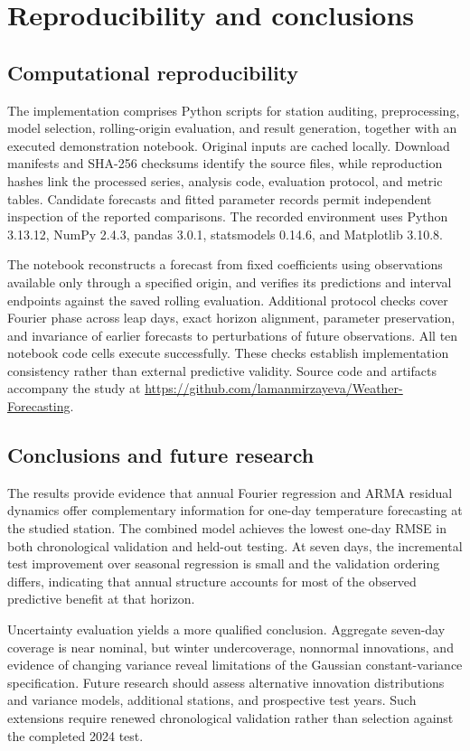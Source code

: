 \documentclass{article}
\begin{document}
\newpage
\section{Reproducibility and conclusions}
\subsection{Computational reproducibility}
The implementation comprises Python scripts for station auditing,
preprocessing, model selection, rolling-origin evaluation, and result
generation, together with an executed demonstration notebook. Original inputs
are cached locally. Download manifests and SHA-256 checksums identify the
source files, while reproduction hashes link the processed series, analysis
code, evaluation protocol, and metric tables. Candidate forecasts and fitted
parameter records permit independent inspection of the reported comparisons.
The recorded environment uses Python 3.13.12, NumPy 2.4.3, pandas 3.0.1,
statsmodels 0.14.6, and Matplotlib 3.10.8.

The notebook reconstructs a forecast from fixed coefficients using observations
available only through a specified origin, and verifies its predictions and
interval endpoints against the saved rolling evaluation. Additional protocol
checks cover Fourier phase across leap days, exact horizon alignment,
parameter preservation, and invariance of earlier forecasts to perturbations
of future observations. All ten notebook code cells execute successfully.
These checks establish implementation consistency rather than external
predictive validity. Source code and artifacts accompany the study at
\url{https://github.com/lamanmirzayeva/Weather-Forecasting}.

\subsection{Conclusions and future research}
The results provide evidence that annual Fourier regression and ARMA residual
dynamics offer complementary information for one-day temperature forecasting
at the studied station. The combined model achieves the lowest one-day RMSE
in both chronological validation and held-out testing. At seven days, the
incremental test improvement over seasonal regression is small and the
validation ordering differs, indicating that annual structure accounts for
most of the observed predictive benefit at that horizon.

Uncertainty evaluation yields a more qualified conclusion. Aggregate seven-day
coverage is near nominal, but winter undercoverage, nonnormal innovations,
and evidence of changing variance reveal limitations of the Gaussian
constant-variance specification. Future research should assess alternative
innovation distributions and variance models, additional stations, and
prospective test years. Such extensions require renewed chronological
validation rather than selection against the completed 2024 test.
\end{document}
